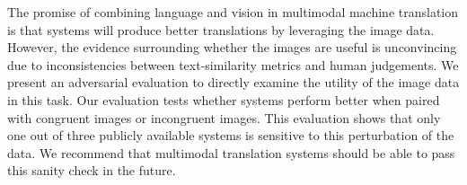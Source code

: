 The promise of combining language and vision in multimodal machine translation is that systems will produce better translations by leveraging the image data. However, the evidence surrounding whether the images are useful is unconvincing due to inconsistencies between text-similarity metrics and human judgements. We present an adversarial evaluation to directly examine the utility of the image data in this task. Our evaluation tests whether systems perform better when paired with congruent images or incongruent images. This evaluation shows that only one out of three publicly available systems is sensitive to this perturbation of the data. We recommend that multimodal translation systems should be able to pass this sanity check in the future.
